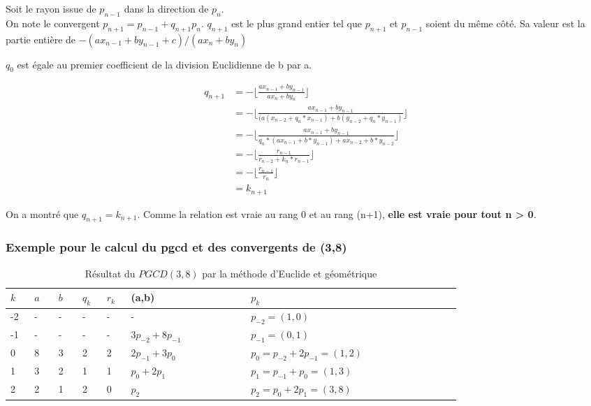 Soit le rayon issue de $p_{n-1}$ dans la direction de $p_{n}$.\\
On note le convergent $p_{n+1} = p_{n-1} + q_{n+1} p_{n}$. $q_{n+1}$ est le plus grand entier tel que $p_{n+1}$ et $p_{n-1}$ soient du même côté. Sa valeur est la partie entière de $-(a x_{n-1} + b y_{n-1} +c)/(a x_{n} + b y_{n})$


$q_0$ est égale au premier coefficient de la division Euclidienne de b par a.

\begin{align*}
q_{n+1} &= - \lfloor\frac{a x_{n-1} + b y_{n-1}}{ a x_{n} + b y_{n}}\rfloor \\
        &= - \lfloor\frac{a x_{n-1} + b y_{n-1}}{ (a (x_{n-2} + q_n * x_{n-1}) + b (y_{n-2} + q_n * y_{n-1})}\rfloor \\
        &= - \lfloor\frac{a x_{n-1} + b y_{n-1}}{ q_n*(a x_{n-1} + b*y_{n-1} ) + a x_{n-2} + b*y_{n-2}  }\rfloor \\
        &= - \lfloor\frac{r_{n-1}              }{ r_{n-2} + k_n * r_{n-1}}\rfloor \\
        &= - \lfloor\frac{r_{n-1}              }{ r_{n} }\rfloor \\
        &= k_{n+1}
\end{align*}

On a montré que \textbf{$q_{n+1}= k_{n+1}$}. Comme la relation est vraie au rang 0 et au rang (n+1),  \textbf{elle est vraie pour tout n > 0}.

\subsubsection{Exemple pour le calcul du pgcd et des convergents de (3,8)}

 \begin{table}[H]
   \centering
   \begin{tabular}{|p{0.04\linewidth}|p{0.04\linewidth}|p{0.04\linewidth}||p{0.04\linewidth}|p{0.04\linewidth}||p{0.2\linewidth}||p{0.35\linewidth}|}
     \hline 
     $k$ & $a$ & $b$ & $q_{k}$ & $r_k$ & (a,b) & $p_k$ \\
     \hline 
     -2 & - & - & - & - & -                    & $p_{-2} = (1,0)$\\
     -1 & - & - & - & - & $3 p_{-2} + 8p_{-1}$ & $p_{-1} = (0,1)$\\
      0 & 8 & 3 & 2 & 2 & $2 p_{-1} + 3p_{0}$  & $p_{0}  = p_{-2} + 2p_{-1} = (1,2)$\\ 
      1 & 3 & 2 & 1 & 1 & $p_{0}  + 2p_{1}$    & $p_{1}  = p_{-1} + p_{0} = (1,3)$\\
      2 & 2 & 1 & 2 & 0 & $p_{2}$              & $p_{2}  = p_{0} + 2p_{1} = (3,8)$\\
     \hline
   \end{tabular} 
   \caption{Résultat du $PGCD(3,8)$ par la méthode d'Euclide et géométrique}
 \end{table}


